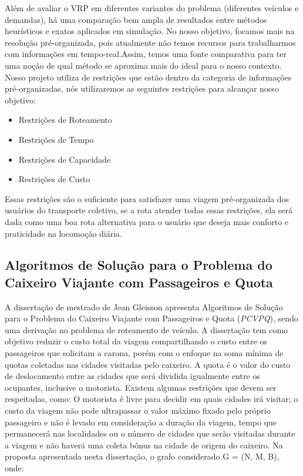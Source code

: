  Além de avaliar o VRP em diferentes variantes do problema (diferentes veículos e demandas), há uma comparação bem ampla de resultados entre métodos heurísticos e exatos aplicados em simulação. No nosso objetivo, focamos mais na resolução pré-organizada, pois atualmente não temos recursos para trabalharmos com informações em tempo-real.Assim, temos uma fonte comparativa para ter uma noção de qual método se aproxima mais do ideal para o nosso contexto. Nosso projeto utiliza de restrições que estão dentro da categoria de informações pré-organizadas, nós utilizaremos as seguintes restrições para alcançar nosso objetivo:
 
\begin{itemize}
\item Restrições de Roteamento
\item Restrições de Tempo
\item Restrições de Capacidade
\item Restrições de Custo
\end{itemize}

Essas restrições são o suficiente para satisfazer uma viagem pré-organizada dos usuários do transporte coletivo, se a rota atender todas essas restrições, ela será dada como uma boa rota alternativa para o usuário que deseja mais conforto e praticidade na locomoção diária.
 
 \subsection{Algoritmos de Solução para o Problema do Caixeiro Viajante com Passageiros e Quota}
 
 A dissertação de mestrado de Jean Gleisson apresenta Algoritmos de Solução para o Problema do Caixeiro Viajante com Passageiros e Quota (\emph{PCVPQ}), sendo uma derivação no problema de roteamento de veículo. A dissertação tem como objetivo reduzir o custo total da viagem compartilhando o custo entre os passageiros que solicitam a carona, porém com o enfoque na soma mínima de quotas coletadas nas cidades visitadas pelo caixeiro. A quota é o valor do custo de deslocamento entre as cidades que será dividida igualmente entre os ocupantes, inclusive o motorista.
Existem algumas restrições que devem ser respeitadas, como: O motorista é livre para decidir em quais cidades irá visitar; o custo da viagem não pode ultrapassar o valor máximo fixado pelo próprio passageiro e não é levado em consideração a duração da viagem, tempo que permanecerá nas localidades ou o número de cidades que serão visitadas durante a viagem e não haverá uma coleta bônus na cidade de origem do caixeiro.
Na proposta apresentada nesta dissertação, o grafo considerado G = (N, M, B), onde:

